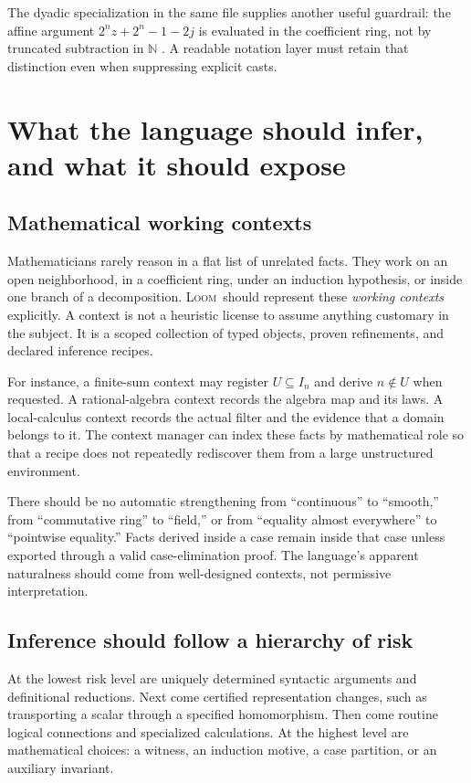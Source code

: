 \documentclass[11pt,letterpaper]{article}
\newcommand{\Loom}{\textsc{Loom}}
\newcommand{\N}{\mathbb N}
\theoremstyle{remark}
\begin{document}
The dyadic specialization in the same file supplies another useful guardrail: the affine argument $2^nz+2^n-1-2j$ is evaluated in the coefficient ring, not by truncated subtraction in $\N$ \cite{proveit-affine}. A readable notation layer must retain that distinction even when suppressing explicit casts.

\section{What the language should infer, and what it should expose}
\label{sec:inference}

\subsection{Mathematical working contexts}

Mathematicians rarely reason in a flat list of unrelated facts. They work on an open neighborhood, in a coefficient ring, under an induction hypothesis, or inside one branch of a decomposition. \Loom\ should represent these \emph{working contexts} explicitly. A context is not a heuristic license to assume anything customary in the subject. It is a scoped collection of typed objects, proven refinements, and declared inference recipes.

For instance, a finite-sum context may register $U\subseteq I_n$ and derive $n\notin U$ when requested. A rational-algebra context records the algebra map and its laws. A local-calculus context records the actual filter and the evidence that a domain belongs to it. The context manager can index these facts by mathematical role so that a recipe does not repeatedly rediscover them from a large unstructured environment.

There should be no automatic strengthening from ``continuous'' to ``smooth,'' from ``commutative ring'' to ``field,'' or from ``equality almost everywhere'' to ``pointwise equality.'' Facts derived inside a case remain inside that case unless exported through a valid case-elimination proof. The language's apparent naturalness should come from well-designed contexts, not permissive interpretation.

\subsection{Inference should follow a hierarchy of risk}

At the lowest risk level are uniquely determined syntactic arguments and definitional reductions. Next come certified representation changes, such as transporting a scalar through a specified homomorphism. Then come routine logical connections and specialized calculations. At the highest level are mathematical choices: a witness, an induction motive, a case partition, or an auxiliary invariant.
\end{document}
